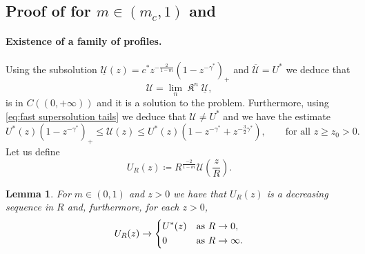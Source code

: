 \documentclass[a4paper]{article}
\newtheorem{lemma}[theorem]{Lemma}
\theoremstyle{definition}
\DeclareMathOperator{\fixedpoint}{\mathfrak K}
\begin{document}
%

%
%
%
%
%
%
%
%
%
%
%
%
%
%
%
%
%
%
%
%
%
%
%
%
%
%
%
%
%
%
%
%
%
%
%
%

%
%
%
%
%
%
%
%
%
%
%

\subsection{Proof of  for $m \in (m_c,1)$ and }
\label{sec:existence proof m < 1}
\paragraph{Existence of a family of profiles.}
Using the subsolution $\underline{\mathcal U}(z) = c^*z^{-\frac{2}{1-m}}(1 - z^{-\gamma^*})_+$ and $\overline{\mathcal U} = U^* $ we deduce that
\begin{equation}
\label{eq:m<1 canonical solution}
\mathcal U = \lim_n \fixedpoint^n \underline{\mathcal U},
\end{equation}
is in $C((0,+\infty))$ and it is a solution to the problem.
Furthermore, using \eqref{eq:fast supersolution tails} we deduce that $\mathcal U \ne U^*$ and we have the estimate
\begin{equation*}\label{Lbeh.VSSfan}
U^*(z) ( 1 - z^{-\gamma^*} )_+
\le \mathcal U(z) \le
U^*(z) (1 - z^{-\gamma^*} + z^{-\frac 3 2 \gamma^*}), \qquad \text{for all } z \ge z_0 > 0.
\end{equation*}
Let us define
\[
U_R(z) \coloneqq R^{\frac{-2}{1-m}} \mathcal U\left(\frac{z}{R}\right).
\]
\begin{lemma}
\label{lem:fast rescaled limits in R}
For $m \in (0,1)$ and $z > 0$ we have that $U_R(z)$ is a decreasing sequence in $R$ and, furthermore, for each $z>0$,
\[
  U_R(z) \to
  \begin{dcases}
    U^*(z) & \text{as } R \to 0,      \\
    0      & \text{as } R \to \infty.
  \end{dcases}
\]
\end{lemma}
\end{document}
